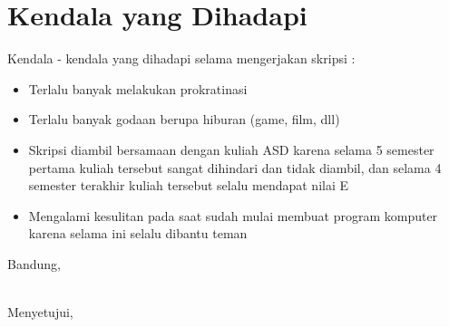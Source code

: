 \documentclass[a4paper,twoside]{article}
\begin{document}
\section{Kendala yang Dihadapi}
Kendala - kendala yang dihadapi selama mengerjakan skripsi :
\begin{itemize}
	\item Terlalu banyak melakukan prokratinasi
	\item Terlalu banyak godaan berupa hiburan (game, film, dll)
	\item Skripsi diambil bersamaan dengan kuliah ASD karena selama 5 semester pertama kuliah tersebut sangat dihindari dan tidak diambil, dan selama 4 semester terakhir kuliah tersebut selalu mendapat nilai E
	\item Mengalami kesulitan pada saat sudah mulai membuat program komputer karena selama ini selalu dibantu teman
\end{itemize}

\vspace{1cm}
\centering Bandung, \tanggal\\
\vspace{2cm} \nama \\
\vspace{1cm}

Menyetujui, \\
\end{document}
